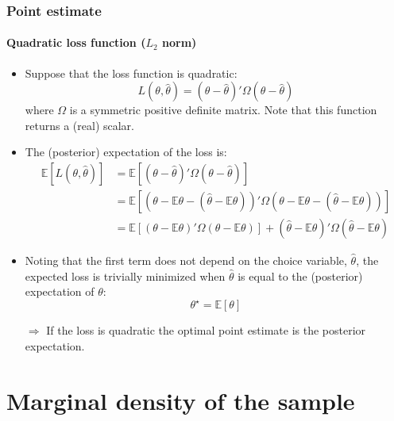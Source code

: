 \documentclass[10pt,slidestop]{beamer}
\begin{document}
\begin{frame}
  \frametitle{Point estimate}
  \framesubtitle{Quadratic loss function ($L_2$ norm)}
  \begin{itemize}
  \item Suppose that the loss function is quadratic:
    \[
    L(\theta,\widehat{\theta}) = (\theta-\widehat{\theta})'\Omega(\theta-\widehat{\theta})
    \]
    where $\Omega$ is a symmetric positive definite matrix. Note that
    this function returns a (real) scalar.
    \bigskip
  \item The (posterior) expectation of the loss is:
    \medskip
    {\tiny\[
    \begin{split}
      \mathbb  E \left[L(\theta,\widehat{\theta})\right] &=
      \mathbb  E \left[(\theta-\widehat{\theta})'\Omega(\theta-\widehat{\theta})\right]\\
      &= \mathbb  E \left[\left(\theta-\mathbb E\theta-\left(\widehat{\theta}-\mathbb E\theta\right)\right)'\Omega\left(\theta-\mathbb E\theta-\left(\widehat{\theta}-\mathbb E\theta\right)\right)\right]\\
      &= \mathbb  E \left[\left(\theta-\mathbb E\theta\right)'\Omega\left(\theta-\mathbb E\theta\right)\right]+(\widehat{\theta}-\mathbb E\theta)'\Omega(\widehat{\theta}-\mathbb E\theta)
    \end{split}
    \]}
  \bigskip
  \item Noting that the first term does not depend on the choice
    variable, $\widehat{\theta}$, the expected loss is trivially
    minimized when $\widehat{\theta}$ is equal to the (posterior)
    expectation of $\theta$:
    \[
    \theta^{\star} = \mathbb E \left[\theta\right]
    \]
    \item[$\Rightarrow$] If the loss is quadratic the optimal point
      estimate is the posterior expectation.
  \end{itemize}
\end{frame}


\section{Marginal density of the sample}
\end{document}
